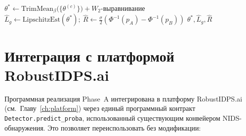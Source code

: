 \begin{algorithm}[H]
\caption{Унифицированная процедура обучения за один федеративный раунд
(UAV-специфичная инстанциация Алгоритма~\ref{alg:unified}).}
\label{alg:uav_unified_round}
$\theta^{*}\leftarrow \mathrm{TrimMean}_{\beta}\bigl(\{\theta^{(c)}\}\bigr)
  + W_2\text{-выравнивание}$
$\hat L_g \leftarrow \mathrm{LipschitzEst}(\theta^{*});\
  \hat R \leftarrow \tfrac{\sigma}{2}(\Phi^{-1}(p_A)-\Phi^{-1}(p_B))$\;
\Return $\theta^{*},\hat L_g,\hat R$\;
\end{algorithm}

\section{Интеграция с платформой \textsf{RobustIDPS.ai}}
\label{sec:uav_robustidps_integration}

Программная реализация Phase~A интегрирована в платформу
\textsf{RobustIDPS.ai} (см.~Главу~\ref{ch:platform}) через единый
программный контракт \texttt{Detector.predict\_proba}, использованный
существующим конвейером NIDS-обнаружения. Это позволяет переиспользовать
без модификации:

